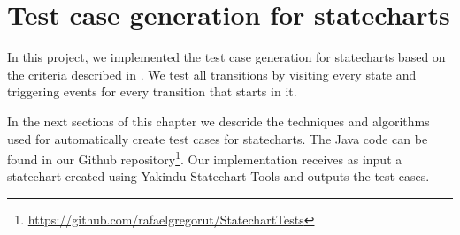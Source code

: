 \chapter{Test case generation for statecharts}
\label{cap:testgen}


%

%

In this project, we implemented the test case generation for statecharts based on the criteria described in \cite{bogdanov}. We test all transitions by visiting every state and triggering events for every transition that starts in it. 

In the next sections of this chapter we descride the techniques and algorithms used for automatically create test cases for statecharts. The Java code can be found in our Github repository\footnote{\url{https://github.com/rafaelgregorut/StatechartTests}}. Our implementation receives as input a statechart created using Yakindu Statechart Tools \cite{Yakindu} and outputs the test cases.





